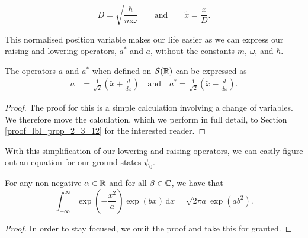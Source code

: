 \begin{equation*}
  D = \sqrt{\frac{\hbar}{m\omega}} \qquad \text{and} \qquad \tilde{x} = \frac{x}{D}.
\end{equation*}

This normalised position variable makes our life easier as we can express our raising and lowering operators, $a^*$ and $a$, without the constants $m$, $\omega$, and $\hbar$.

\begin{proposition}\label{lbl_prop_2_3_12}
  The operators $a$ and $a^*$ when defined on $\mathcal{S}(\mathbb{R})$ can be expressed as
  \begin{align*}
    a   &= \frac{1}{\sqrt{2}}\left( \tilde{x} + \frac{d}{d\tilde{x}} \right) \quad \text{and} \quad
    a^* = \frac{1}{\sqrt{2}}\left( \tilde{x} - \frac{d}{d\tilde{x}} \right).
  \end{align*}
\end{proposition}
\begin{proof}
  The proof for this is a simple calculation involving a change of variables. We therefore move the calculation, which we perform in full detail, to Section \eqref{proof_lbl_prop_2_3_12} for the interested reader.
\end{proof}

With this simplification of our lowering and raising operators, we can easily figure out an equation for our ground states $\psi_0$.

\begin{lemma}\label{lbl_oscillator_hard_integral}
  For any non-negative $\alpha \in \mathbb{R}$ and for all $\beta \in \mathbb{C}$, we have that
  \begin{equation*}
    \int_{-\infty}^{\infty} \exp\left(-\frac{x^2}{a}\right) \exp\left(bx\right) \,\mathrm{d}x
    =
    \sqrt{2\pi a}\exp\left(ab^2\right).
  \end{equation*}
\end{lemma}
\begin{proof}
  In order to stay focused, we omit the proof and take this for granted.
\end{proof}

